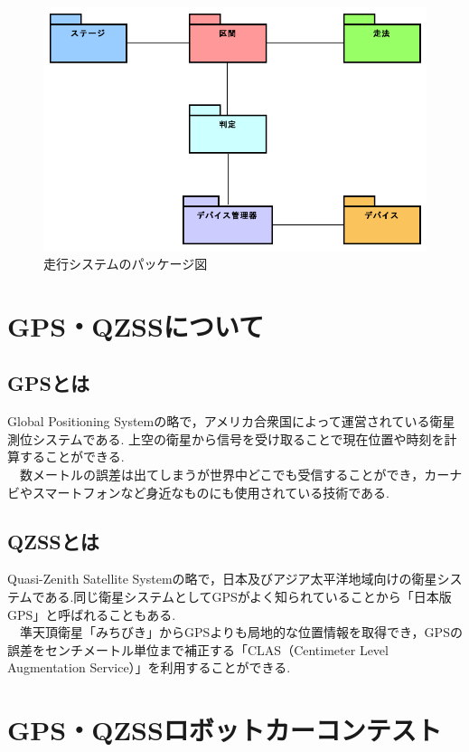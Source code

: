 \documentclass[submit,techrep,noauthor]{ipsj}
\begin{document}
\begin{figure}[h]
 \centering
   \includegraphics[scale=0.37]{package.png}
 \caption{走行システムのパッケージ図}
 \label{パッケージ図}
\end{figure} 



\section{GPS・QZSSについて}

\subsection{GPSとは}
Global Positioning Systemの略で，アメリカ合衆国によって運営されている衛星測位システムである.
上空の衛星から信号を受け取ることで現在位置や時刻を計算することができる.\\
　数メートルの誤差は出てしまうが世界中どこでも受信することができ，カーナビやスマートフォンなど身近なものにも使用されている技術である.


\subsection{QZSSとは}
Quasi-Zenith Satellite Systemの略で，日本及びアジア太平洋地域向けの衛星システムである.同じ衛星システムとしてGPSがよく知られていることから「日本版GPS」と呼ばれることもある.\\
　準天頂衛星「みちびき」からGPSよりも局地的な位置情報を取得でき，GPSの誤差をセンチメートル単位まで補正する「CLAS（Centimeter Level Augmentation Service）」を利用することができる.

\section{GPS・QZSSロボットカーコンテスト}
\end{document}
